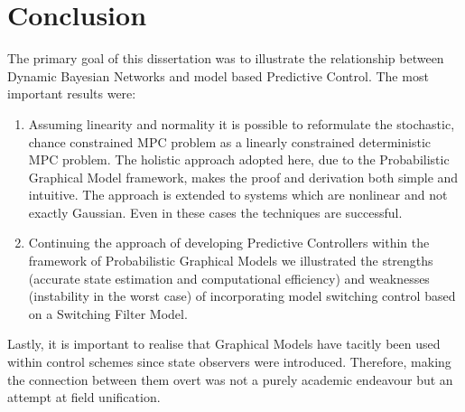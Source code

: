 \section{Conclusion}
The primary goal of this dissertation was to illustrate the relationship between Dynamic Bayesian Networks and model based Predictive Control. The most important results were:
\begin{enumerate}
\item
Assuming linearity and normality it is possible to reformulate the stochastic, chance constrained MPC problem as a linearly constrained deterministic MPC problem. The holistic approach adopted here, due to the Probabilistic Graphical Model framework, makes the proof and derivation both simple and intuitive. The approach is extended to systems which are nonlinear and not exactly Gaussian. Even in these cases the techniques are successful.
\item
Continuing the approach of developing Predictive Controllers within the framework of Probabilistic Graphical Models we illustrated the strengths (accurate state estimation and computational efficiency) and weaknesses (instability in the worst case) of incorporating model switching control based on a Switching Filter Model.
\end{enumerate} 
Lastly, it is important to realise that Graphical Models have tacitly been used within control schemes since state observers were introduced. Therefore, making the connection between them overt was not a purely academic endeavour but an attempt at field unification.